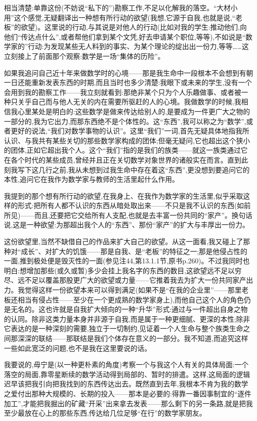 相当清楚:单靠这份(不妨说“私下的”)勘察工作,不足以化解我的落空。“大材小用”这个感觉,无疑翻译出一种想有所行动的欲望(我想,它源于自我,也就是说,“老板”的欲望)。这里说的行动,与其说是对他人的行动(比如对我的学生:推动他们,向他们“传达点什么”,或者帮他们拿到某个文凭,好去申请某个职位,等等),不如说是“数学家的”行动:为发现某些无人料到的事实、为某个理论的绽出出一份力,等等……这立刻接上了前面那个观察:数学是一场“集体的历险”。

 如果我追问自己近十年来做数学时的心境——那是我生命中一段根本不会想到有朝一日还能重新发表东西的时期,而且当时也多少清楚:我眼下或未来的学生,没有一个会用到我的勘察工作——我立刻就看到:那绝非某个只为个人乐趣做事、或者被一种只关乎自己而与他人无关的内在需要所驱赶的人的心境。我做数学的时候,我相信我心里某处是明白的:这些数学是做来传达给别人的,是要成为一件更广大之物的一部分的,我为它出力,而那东西绝不是个体性的。这“东西”,我可以称之为“数学”,或者更好的说法,“我们对数学事物的认识”。这里“我们”一词,首先无疑具体地指我所认识、与我共有某些关切的那些数学家构成的团体;但毫无疑问,它也超出这个狭小的团体,正如它超出我个人。这个“我们”指的是我们的族类——就这一族类通过它在各个时代的某些成员,曾经并且正在关切数学对象世界的诸般实在而言。直到此刻我写下这几行之前,我从未想到过我生命中存在着这“东西”,更没想到要追问它的本性,追问它在我作为数学家与教师的生活里起什么作用。

我提到的那个想有所行动的欲望,在我身上、在我作为数学家的生活里,似乎采取这样的形式:把所有人都不认识的东西从暗处取出来——不只是我不认识的东西(如前所见)——而且,还要把它交给所有人支配,也就是去丰富一份共同的“家产”。换句话说,这是一种欲望:为那超出我个人的“东西”、那份“家产”的扩大与丰厚出一份力。

这份欲望里,当然不缺借自己的作品来扩大自己的欲望。从这一面看,我又碰上了那种对“成长”、对扩大的饥饿——那是自我、是“老板”的特征之一;那是他侵占性的一面,推到极处便是毁灭性的一面(参见注44,第13.1.1节,原书p.260)。不过我同时也明白:想增加那些(或久或暂)多少会挂上我名字的东西的数目,这欲望远不足以穷尽、远不足以覆盖那股更广大的欲望或力量——它推着我去为扩大一份共同家产出力。我觉得这样一份欲望本来可以得到满足(如果不是“在我的企业里”——那里老板还相当有侵占性——至少在一个更成熟的数学家身上),而他自己这个人的角色仍是无名的。这也许就是自我扩大倾向的一种“升华”形式:通过与一件超出自身之物的认同。除非这类力量本身并非源于自我,而是属于一种更细腻、更深的本性;除非它表达的是一种深刻的需要,独立于一切制约,见证着一个人生命与整个族类生命之间那深深的联结——那联结是我们个体存在意义的一部分。我不知道,而追究这样一些如此宽泛的问题,也不是我在这里要说的话。

我要说的,毋宁是(以一种更朴素的角度)考察一个与我这个人有关的具体局面:一个落空的局面,靠零星断续的数学活动得到局部的、暂时的排遣。这样,这局面的逻辑迟早该把我引向把我找到的东西传达出去。既然直到去年,我根本不肯为我的数学之爱付出那种大规模的、长期的投入——那本是必要的:得靠一番因事制宜的“逐件加工”,才能把我掘出的矿藏“开采”出来拿去发表——那么剩下的另一条路,就是把我至少最放在心上的那些东西,传达给几位足够“在行”的数学家朋友。


